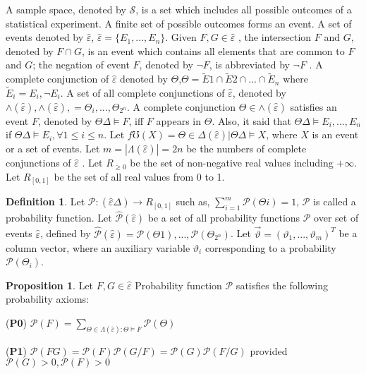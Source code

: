 \documentclass[10pt,a4paper]{IOS-Book-Article}
\begin{document}
A sample space, denoted by $\mathcal S$, is a set which includes all possible outcomes of a statistical experiment. A finite set of possible outcomes forms an event. A set of events denoted by $\hat{\varepsilon}$, $\hat{\varepsilon} = \{ E _1, ... , E_n \}$. Given $F,G \in \hat{\varepsilon}$ , the intersection $F$ and $G$, denoted by $F \cap G$, is an event which contains all elements that are common to $F$ and $G$; the negation of event $F$, denoted by $\neg F$, is abbreviated by $\neg F$ . A complete conjunction of $\hat{\varepsilon}$ denoted by $\Theta$,$\Theta = \tilde E1 \cap \tilde E2 \cap ... \cap \tilde E_n$ where $\tilde E_i = {E_i, \neg E_i}$. A set of all complete conjunctions of $\hat{\varepsilon}$, denoted by $\wedge (\hat{\varepsilon}),\wedge (\hat{\varepsilon}),= {\Theta_i, ... , \Theta_{2^n}  }$. A complete conjunction $\Theta \in \wedge (\hat{\varepsilon} )$ satisfies an event $F$, denoted by $\Theta \Delta \models F$, iff  $F$ appears in $\Theta$. Also, it said that $\Theta \Delta \models {E_i, ... , E_n}$ if $\Theta \Delta \models E_i, \forall 1 \le i \le n$. Let $f\mho (X) = {\Theta \in \Delta (\hat{\varepsilon} )|\Theta \Delta \models X}$, where $X$ is an event or a set of events. Let $m = |\Lambda(\hat{\varepsilon})| = 2n$ be the numbers of complete conjunctions of $\hat{\varepsilon}$ . Let $R_{\geq0}$ be the set of non-negative real values including $+\infty$. Let $R_{[0,1]}$ be the set of all real values from 0 to 1.

\textbf{Definition 1}. Let $\mathcal{P} : (\hat{\varepsilon} \Delta ) \to R_{[0,1]}$ such as, 
$\sum_{i=1}^m \mathcal{P} (\Theta i) = 1$, $\mathcal{P}$ is called a probability function.
Let $\hat{\mathcal{P}} (\hat  \varepsilon )$ be a set of all probability functions $\mathcal{P}$ over set of events $\hat  \varepsilon$, defined by $\hat{\mathcal{P}}(\hat  \varepsilon) =  {\mathcal{P} (\Theta1), ... ,\mathcal{P} (\Theta_{2^n} )}$. Let $\vec{\vartheta} = (\vartheta_1, ... , \vartheta_m)^T$ be a column vector, where an auxiliary variable $\vartheta_i$ corresponding to a probability $\mathcal{P}(\Theta_i)$.

\textbf{Proposition 1}. Let $F,G \in \hat{\varepsilon}$ Probability function $\mathcal{P}$ satisfies the following probability axioms:

(\textbf{P0}) $\mathcal{P}(F) = \sum_{\Theta  \in  \Lambda (\hat{\varepsilon}):\Theta  \models F}\mathcal{P}(\Theta)$

(\textbf{P1}) $\mathcal{P} (FG) = \mathcal{P} (F) \mathcal{P} (G/F) = \mathcal{P} (G) \mathcal{P} (F/G)$ provided $\mathcal{P} (G) > 0,\mathcal{P} (F) > 0$
\end{document}
